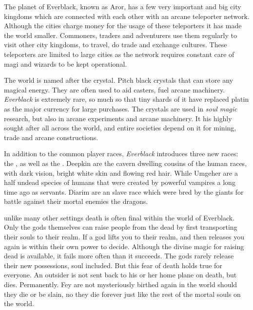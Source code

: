 \begin{enumerate}
  The planet of Everblack, known as Aror, has a
 few very important and big city kingdoms which are connected with each other
 with an arcane teleporter network. Although the cities charge money for the
 usage of these teleporters it has made the world smaller. Commoners, traders
 and adventurers use them regularly to visit other city kingdoms, to travel,
 do trade and exchange cultures. These teleporters are limited to large cities
 as the network requires constant care of magi and wizards to be kept
 operational.

  The world is named after the 
 crystal. Pitch black crystals that can store any magical energy. They are
 often used to aid casters, fuel arcane machinery. \emph{Everblack} is
 extremely rare, so much so that tiny shards of it have replaced platin as the
 major currency for large purchases. The crystals are used in \emph{soul
 magic} research, but also in arcane experiments and arcane machinery. It his
 highly sought after all across the world, and entire societies depend on it
 for mining, trade and arcane constructions.

  In addition to the common player races, \emph{Everblack}
 introduces three new races: the , 
 as well as the . Deepkin are the cavern dwelling cousins
 of the human races, with dark vision, bright white skin and flowing red
 hair. While Umgeher are a half undead species of humans that were created by
 powerful vampires a long time ago as servants. Diarim are an slave race which
 were bred by the giants for battle against their mortal enemies the dragons.

  unlike many other settings death is often final
 within the world of Everblack. Only the gods themselves can raise people from
 the dead by first transporting their souls to their realm. If a god lifts you
 to their realm, and then releases you again is within their own power to
 decide. Although the divine magic for raising dead is available, it fails more
 often than it succeeds. The gods rarely release their new possessions, soul
 included. But this fear of death holds true for everyone. An outsider is not
 sent back to his or her home plane on death, but dies. Permanently. Fey are
 not mysteriously birthed again in the world should they die or be slain, no
 they die forever just like the rest of the mortal souls on the world.

\end{enumerate}


